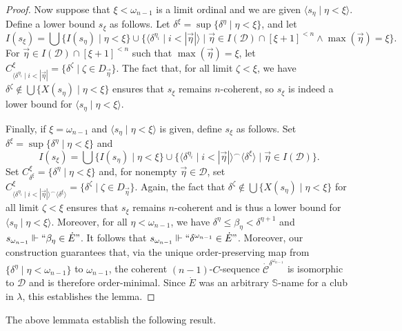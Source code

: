 \documentclass{amsart}
\numberwithin{theorem}{section}
\theoremstyle{definition}
\newcommand{\bb}{\mathbb}
\newcommand{\mc}{\mathcal}
\begin{document}
\begin{proof}
  Now suppose that $\xi < \omega_{n-1}$ is a limit ordinal and we are given 
  $\langle s_\eta \mid \eta < \xi \rangle$. Define a lower bound $s_\xi$ as follows. 
  Let $\delta^\xi = \sup\{\delta^\eta \mid \eta < \xi\}$, and let 
  \[
    I(s_\xi) = \bigcup\{I(s_\eta) \mid \eta < \xi\} \cup 
    \{\langle \delta^{\eta_i} \mid i < |\vec{\eta}| \rangle \mid 
    \vec{\eta} \in I(\mc{D}) \cap [\xi+1]^{{<}n} \wedge 
    \max(\vec{\eta}) = \xi\}.
  \]
  For $\vec{\eta} \in I(\mc{D}) \cap [\xi+1]^{{<}n}$ such that 
  $\max(\vec{\eta}) = \xi$, let $C^{\xi}_{\langle \delta^{\eta_i} \mid 
  i < |\vec{\eta}|} = \{\delta^\zeta \mid \zeta \in D_{\vec{\eta}}\}$.
  The fact that, for all limit $\zeta < \xi$, we have 
  $\delta^\zeta \notin \bigcup \{X(s_\eta) \mid \eta < \xi\}$ 
  ensures that $s_\xi$ remains $n$-coherent, so $s_\xi$ is indeed a lower bound 
  for $\langle s_\eta \mid \eta < \xi \rangle$. 
  
  Finally, if $\xi = \omega_{n-1}$ and $\langle s_\eta \mid \eta < \xi \rangle$ 
  is given, define $s_\xi$ as follows. Set $\delta^{\xi} = \sup\{\delta^\eta 
  \mid \eta < \xi\}$ and 
  \[ 
    I(s_\xi) = \bigcup \{I(s_\eta) \mid \eta < \xi\} \cup 
    \{\langle \delta^{\eta_i} \mid i < |\vec{\eta}| \rangle^\frown 
    \langle \delta^\xi \rangle \mid \vec{\eta} \in I(\mc{D}) \}.
  \]
  Set $C^\xi_{\delta^\xi} = \{\delta^\eta \mid \eta < \xi\}$ and, for 
  nonempty $\vec{\eta} \in \mc{D}$, set 
  $C^\xi_{\langle \delta^{\eta_i} \mid i < |\vec{\eta}| \rangle^\frown 
  \langle \delta^\xi \rangle} = \{\delta^\zeta \mid \zeta \in D_{\vec{\eta}}\}$.
  Again, the fact that $\delta^\zeta \notin \bigcup \{X(s_\eta) \mid \eta < \xi\}$ 
  for all limit $\zeta < \xi$ ensures that $s_\xi$ remains $n$-coherent and is 
  thus a lower bound for $\langle s_\eta \mid \eta < \xi \rangle$. 
  Moreover, for all $\eta < \omega_{n-1}$, we have 
  $\delta^\eta \leq \beta_\eta < \delta^{\eta+1}$ and 
  $s_{\omega_{n-1}} \Vdash ``\beta_\eta \in \dot{E}"$. It follows that 
  $s_{\omega_{n-1}} \Vdash ``\delta^{\omega_{n-1}} \in \dot{E}"$. Moreover, 
  our construction guarantees that, via the unique order-preserving map from 
  $\{\delta^\eta \mid \eta < \omega_{n-1}\}$ to $\omega_{n-1}$, the 
  coherent $(n-1)$-$C$-sequence $\dot{\mc{C}}^{\delta^{\omega_{n-1}}}$ is 
  isomorphic to $\mc{D}$ and is therefore order-minimal. Since $\dot{E}$ was 
  an arbitrary $\bb{S}$-name for a club in $\lambda$, this establishes the 
  lemma.
\end{proof}

The above lemmata establish the following result.
\end{document}
